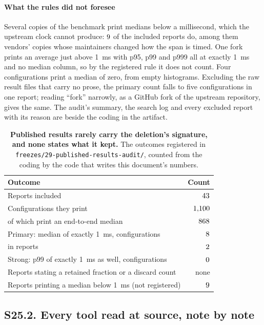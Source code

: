 \documentclass[10pt,journal,onecolumn]{IEEEtran}
\begin{document}
\paragraph{What the rules did not foresee} Several copies of the benchmark print medians below
a millisecond, which the upstream clock cannot produce: $9$ of the included
reports do, among them vendors' copies whose maintainers changed how the span is timed. One
fork prints an average just above 1~ms with p95, p99 and p999 all at exactly 1~ms and no
median column, so by the registered rule it does not count. Four configurations print a median
of zero, from empty histograms. Excluding the raw result files that carry no prose, the primary
count falls to five configurations in one report; reading ``fork'' narrowly, as a GitHub fork
of the upstream repository, gives the same. The audit's summary, the search log and every
excluded report with its reason are beside the coding in the artifact.

\begin{table}[tb]
\caption[The registered outcomes of the published-results audit]{\textbf{Published results
rarely carry the deletion's signature, and none states what it kept.} The outcomes
registered in \texttt{freezes/29-published-results-audit/}, counted from the coding by the
code that writes this document's numbers.}
\label{tab:reach}
\centering
\small
\begin{tabular}{@{}lr@{}}
\toprule
Outcome & Count \\
\midrule
Reports included & $43$ \\
Configurations they print & $1{,}100$ \\
\quad of which print an end-to-end median & $868$ \\
Primary: median of exactly 1~ms, configurations & $8$ \\
\quad in reports & $2$ \\
Strong: p99 of exactly 1~ms as well, configurations & $0$ \\
Reports stating a retained fraction or a discard count & none \\
Reports printing a median below 1~ms (not registered) & $9$ \\
\bottomrule
\end{tabular}
\end{table}

\subsection{S25.2. Every tool read at source, note by note}
\label{sec:toolnotes}
\end{document}
